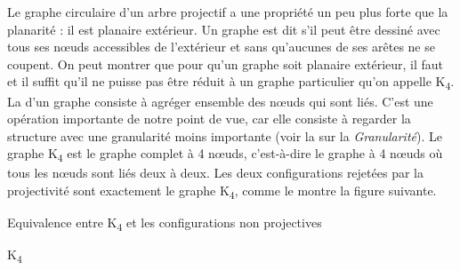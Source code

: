 {    Le graphe circulaire d’un arbre projectif a une propriété un peu plus forte que la planarité : il est planaire extérieur.
    \ea
    Un graphe est dit  s’il peut être dessiné avec tous ses nœuds accessibles de l’extérieur et sans qu’aucunes de ses arêtes ne se coupent.
    \z
    On peut montrer que pour qu’un graphe soit planaire extérieur, il faut et il suffit qu’il ne puisse pas être réduit à un graphe particulier qu’on appelle K\textsubscript{4}. La  d’un graphe consiste à agréger ensemble des nœuds qui sont liés. C’est une opération importante de notre point de vue, car elle consiste à regarder la structure avec une granularité moins importante (voir la  sur la \textit{Granularité}). Le graphe K\textsubscript{4} est le graphe complet à 4 nœuds, c’est-à-dire le graphe à 4 nœuds où tous les nœuds sont liés deux à deux. Les deux configurations rejetées par la projectivité sont exactement le graphe K\textsubscript{4}, comme le montre la figure suivante.

    \ea
    Equivalence entre K\textsubscript{4} et les configurations non projectives\\
    \begin{multicols}{3}\raggedcolumns
    \ea{}
    \columnbreak
    \ex{}
    \columnbreak
    \ex K\textsubscript{4}\\
    \z
    \end{multicols}
    \z
}

